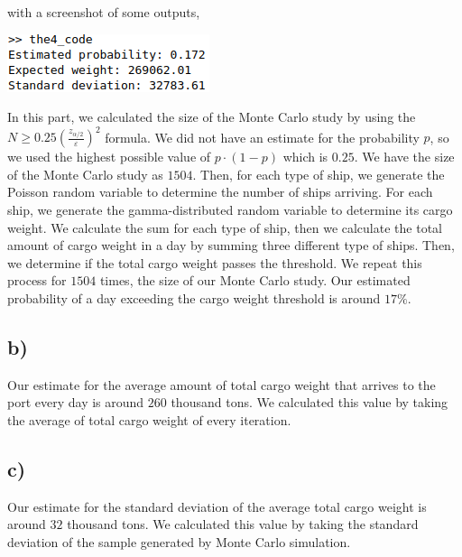 \documentclass[12pt]{article}
\begin{document}
\noindent
with a screenshot of some outputs,

\begin{center}
  \includegraphics[scale = 1]{the4_output.png}
\end{center}

In this part, we calculated the size of the Monte Carlo study by using the $N
\geq 0.25(\frac{z_{\alpha/2}}{\varepsilon})^2$ formula. We did not have an
estimate for the probability $p$, so we used the highest possible value of
$p\cdot(1-p)$ which is $0.25$. We have the size of the Monte Carlo study as
$1504$. Then, for each type of ship, we generate the Poisson random variable to
determine the number of ships arriving. For each ship, we generate the
gamma-distributed random variable to determine its cargo weight. We calculate
the sum for each type of ship, then we calculate the total amount of cargo
weight in a day by summing three different type of ships. Then, we determine if
the total cargo weight passes the threshold. We repeat this process for $1504$
times, the size of our Monte Carlo study. Our estimated probability of a day
exceeding the cargo weight threshold is around $17\%$.

\subsection*{b)}

Our estimate for the average amount of total cargo weight that arrives to the
port every day is around $260$ thousand tons. We calculated this value by taking
the average of total cargo weight of every iteration.

\subsection*{c)}

Our estimate for the standard deviation of the average total cargo weight is
around $32$ thousand tons. We calculated this value by taking the standard
deviation of the sample generated by Monte Carlo simulation.
\end{document}
